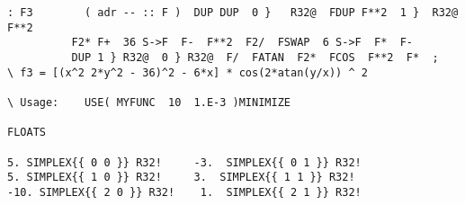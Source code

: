 \begin{lstlisting}
: F3        ( adr -- :: F )  DUP DUP  0 }   R32@  FDUP F**2  1 }  R32@  F**2
          F2* F+  36 S->F  F-  F**2  F2/  FSWAP  6 S->F  F*  F-
          DUP 1 } R32@  0 } R32@  F/  FATAN  F2*  FCOS  F**2  F*  ;
\ f3 = [(x^2 2*y^2 - 36)^2 - 6*x] * cos(2*atan(y/x)) ^ 2

\ Usage:    USE( MYFUNC  10  1.E-3 )MINIMIZE

FLOATS

5. SIMPLEX{{ 0 0 }} R32!     -3.  SIMPLEX{{ 0 1 }} R32!
5. SIMPLEX{{ 1 0 }} R32!     3.  SIMPLEX{{ 1 1 }} R32!
-10. SIMPLEX{{ 2 0 }} R32!    1.  SIMPLEX{{ 2 1 }} R32!
\end{lstlisting}